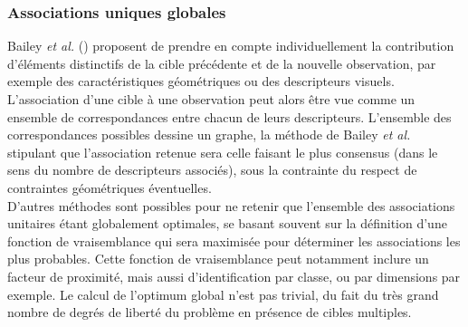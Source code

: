 \subsubsection{Associations uniques globales}
Bailey \textit{et al.} (\cite{Bailey2006}) proposent de prendre en compte individuellement la contribution d'éléments distinctifs de la cible précédente et de la nouvelle observation, par exemple des caractéristiques géométriques ou des descripteurs visuels. L'association d'une cible à une observation peut alors être vue comme un ensemble de correspondances entre chacun de leurs descripteurs. L'ensemble des correspondances possibles dessine un graphe, la méthode de Bailey \textit{et al.} stipulant que l'association retenue sera celle faisant le plus consensus (dans le sens du nombre de descripteurs associés), sous la contrainte du respect de contraintes géométriques éventuelles.\\
D'autres méthodes sont possibles pour ne retenir que l'ensemble des associations unitaires étant globalement optimales, se basant souvent sur la définition d'une fonction de vraisemblance qui sera maximisée pour déterminer les associations les plus probables. Cette fonction de vraisemblance peut notamment inclure un facteur de proximité, mais aussi d'identification par classe, ou par dimensions par exemple. Le calcul de l'optimum global n'est pas trivial, du fait du très grand nombre de degrés de liberté du problème en présence de cibles multiples.\\

